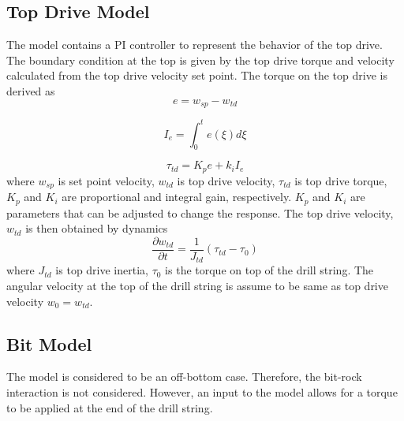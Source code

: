 \subsection{Top Drive Model}
The model contains a PI controller to represent the behavior of the top drive. The boundary condition at the top is given by the top drive torque and velocity calculated from the top drive velocity set point. The torque on the top drive is derived as
\begin{equation}\label{AS_err}
  e = w_{sp} - w_{td}
\end{equation}

\begin{equation}\label{AS_Ie}
  I_e = \int_{0}^{t}e(\xi)d\xi
\end{equation}

\begin{equation}\label{AS_tau_m}
  \tau_{td} = K_pe + k_i I_e
\end{equation}
where $w_{sp}$ is set point velocity, $w_{td}$ is top drive velocity, $\tau_{td}$ is top drive torque, $K_p$ and $K_i$ are proportional and integral gain, respectively. $K_p$ and $K_i$ are parameters that can be adjusted to change the response. The top drive velocity, $w_{td}$ is then obtained by dynamics
\begin{equation}\label{AS_w_td}
  \frac{\partial w_{td}}{\partial t} = \frac{1}{J_{td}}(\tau_{td} - \tau_0)
\end{equation}
where $J_{td}$ is top drive inertia, $\tau_{0}$ is the torque on top of the drill string. The angular velocity at the top of the drill string is assume to be same as top drive velocity $w_0 = w_{td}$.

\subsection{Bit Model}
\label{sec:asbitmodel}
The model is considered to be an off-bottom case.  Therefore, the bit-rock interaction is not considered.  However, an input to the model allows for a torque to be applied at the end of the drill string.

